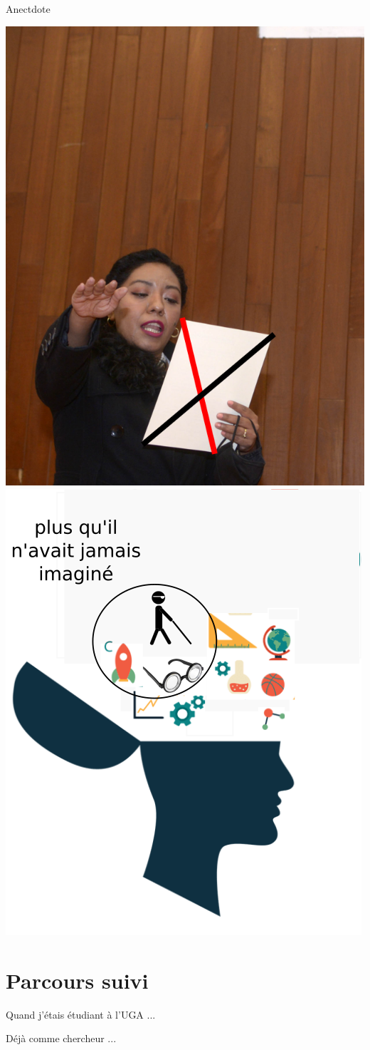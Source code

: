 \documentclass{beamer}
\begin{document}
\begin{frame}
 {Anectdote}

\begin{center}
 \includegraphics[width=0.45\linewidth]{images/juramento2.png}
 \qquad 
 \includegraphics[width=0.45\linewidth]{images/open2.png}
\end{center}

\end{frame}



\section{Parcours suivi}


\begin{frame}

 \centering
 \LARGE Quand j'étais étudiant à l'UGA ...
 
\end{frame}


\begin{frame}

 \centering
 \LARGE Déjà comme chercheur ... 
 
\end{frame}
\end{document}
